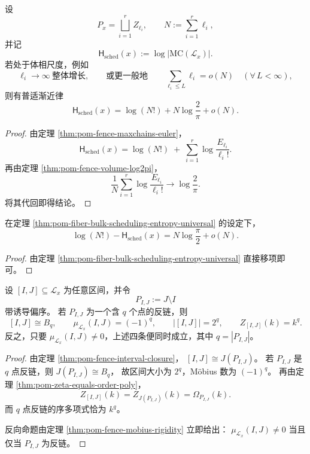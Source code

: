 \begin{theorem}[体相极限下的调度熵普适律]\label{thm:pom-fiber-bulk-scheduling-entropy-universal}
设
\[
P_x=\bigsqcup_{i=1}^r Z_{\ell_i},
\qquad
N:=\sum_{i=1}^r \ell_i,
\]
并记
\[
\mathsf H_{\mathrm{sched}}(x):=\log |\mathrm{MC}(\mathcal L_x)|.
\]
若处于体相尺度，例如
\[
\ell_i\to\infty \ \text{整体增长},
\qquad\text{或更一般地}\qquad
\sum_{\ell_i\le L}\ell_i=o(N)\quad(\forall\,L<\infty),
\]
则有普适渐近律
\[
\mathsf H_{\mathrm{sched}}(x)
=
\log(N!)
+
N\log\frac{2}{\pi}
+
o(N).
\]
\end{theorem}

\begin{proof}
由定理 \ref{thm:pom-fence-maxchains-euler}，
\[
\mathsf H_{\mathrm{sched}}(x)
=
\log(N!)
\;+\;
\sum_{i=1}^r \log\frac{E_{\ell_i}}{\ell_i!}.
\]
再由定理 \ref{thm:pom-fence-volume-log2pi}，
\[
\frac{1}{N}\sum_{i=1}^r \log\frac{E_{\ell_i}}{\ell_i!}
\longrightarrow
\log\frac{2}{\pi}.
\]
将其代回即得结论。
\end{proof}

\begin{corollary}[体相调度熵相对于全碎裂极值的线性赤字]\label{cor:pom-fiber-bulk-scheduling-deficit-linear}
在定理 \ref{thm:pom-fiber-bulk-scheduling-entropy-universal} 的设定下，
\[
\log(N!) - \mathsf H_{\mathrm{sched}}(x)
=
N\log\frac{\pi}{2}
+
o(N).
\]
\end{corollary}

\begin{proof}
由定理 \ref{thm:pom-fiber-bulk-scheduling-entropy-universal} 直接移项即可。
\end{proof}

\begin{theorem}[布尔区间的单参数审计律]\label{thm:pom-fiber-boolean-interval-single-parameter-audit}
设 \([I,J]\subseteq \mathcal L_x\) 为任意区间，并令
\[
P_{I,J}:=J\setminus I
\]
带诱导偏序。
若 \(P_{I,J}\) 为一个含 \(q\) 个点的反链，则
\[
[I,J]\cong B_q,
\qquad
\mu_{\mathcal L_x}(I,J)=(-1)^q,
\qquad
|[I,J]|=2^q,
\qquad
Z_{[I,J]}(k)=k^q.
\]
反之，只要 \(\mu_{\mathcal L_x}(I,J)\neq 0\)，上述四条便同时成立，其中 \(q=|P_{I,J}|\)。
\end{theorem}

\begin{proof}
由定理 \ref{thm:pom-fence-interval-closure}，
\(
[I,J]\cong J(P_{I,J})
\)。
若 \(P_{I,J}\) 是 \(q\) 点反链，则
\(
J(P_{I,J})\cong B_q
\)，
故区间大小为 \(2^q\)，Möbius 数为 \((-1)^q\)。
再由定理 \ref{thm:pom-zeta-equals-order-poly}，
\[
Z_{[I,J]}(k)
=
Z_{J(P_{I,J})}(k)
=
\Omega_{P_{I,J}}(k).
\]
而 \(q\) 点反链的序多项式恰为 \(k^q\)。
\par
反向命题由定理 \ref{thm:pom-fence-mobius-rigidity} 立即给出：
\(\mu_{\mathcal L_x}(I,J)\neq 0\) 当且仅当 \(P_{I,J}\) 为反链。
\end{proof}


